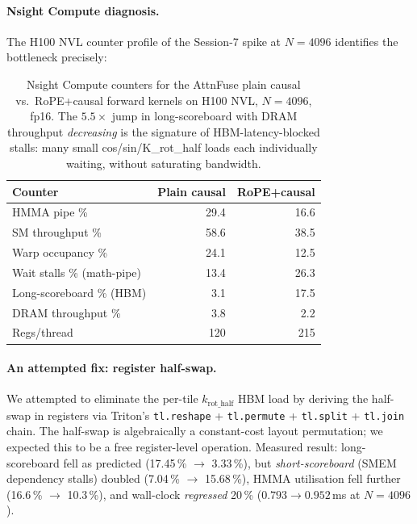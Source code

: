 \paragraph{Nsight Compute diagnosis.} The H100 NVL counter profile of
the Session-7 spike at $N{=}4096$ identifies the bottleneck precisely:

\begin{table}[h]
\centering
\small
\begin{tabular}{lrr}
\toprule
\textbf{Counter} & Plain causal & RoPE+causal \\
\midrule
HMMA pipe \%                & 29.4  & 16.6  \\
SM throughput \%            & 58.6  & 38.5  \\
Warp occupancy \%           & 24.1  & 12.5  \\
Wait stalls \% (math-pipe)  & 13.4  & 26.3  \\
Long-scoreboard \% (HBM)    &  3.1  & 17.5  \\
DRAM throughput \%          &  3.8  &  2.2  \\
Regs/thread                 &  120  &  215  \\
\bottomrule
\end{tabular}
\caption{Nsight Compute counters for the AttnFuse plain causal vs.\
RoPE+causal forward kernels on H100 NVL, $N{=}4096$, fp16. The
$5.5\times$ jump in long-scoreboard with DRAM throughput
\emph{decreasing} is the signature of HBM-latency-blocked stalls:
many small cos/sin/K\_rot\_half loads each individually waiting,
without saturating bandwidth.}
\label{tab:rope_ncu}
\end{table}

\paragraph{An attempted fix: register half-swap.} We attempted to
eliminate the per-tile $k_\text{rot\_half}$ HBM load by deriving the
half-swap in registers via Triton's
\texttt{tl.reshape} + \texttt{tl.permute} + \texttt{tl.split} +
\texttt{tl.join} chain. The half-swap is algebraically a
constant-cost layout permutation; we expected this to be a free
register-level operation. Measured result: long-scoreboard fell as
predicted (17.45\,\% $\to$ 3.33\,\%), but \emph{short-scoreboard}
(SMEM dependency stalls) doubled (7.04\,\% $\to$ 15.68\,\%), HMMA
utilisation fell further (16.6\,\% $\to$ 10.3\,\%), and wall-clock
\emph{regressed} 20\,\% ($0.793 \to 0.952$\,ms at $N{=}4096$).

